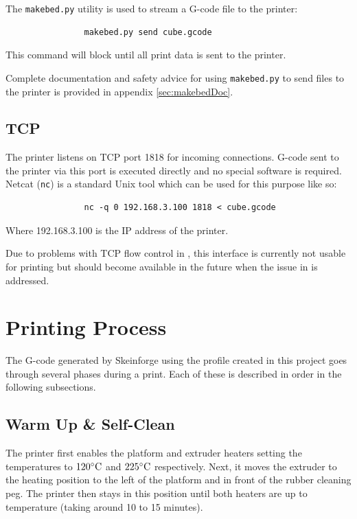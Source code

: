 			The \verb|makebed.py| utility is used to stream a G-code file to the
			printer:
			\begin{verbatim}
				makebed.py send cube.gcode
			\end{verbatim}
			This command will block until all print data is sent to the printer.
			
			Complete documentation and safety advice for using \verb|makebed.py| to
			send files to the printer is provided in appendix \ref{sec:makebedDoc}.
			
		\subsection{TCP}
			
			The printer listens on TCP port 1818 for incoming connections. G-code sent
			to the printer via this port is executed directly and no special software
			is required. Netcat (\verb|nc|) is a standard Unix tool which can be used
			for this purpose like so:
			\begin{verbatim}
				nc -q 0 192.168.3.100 1818 < cube.gcode
			\end{verbatim}
			Where 192.168.3.100 is the IP address of the printer.
			
			Due to problems with TCP flow control in \uIP{}, this interface is
			currently not usable for printing but should become available in the
			future when the issue in \uIP{} is addressed.
	
	\section{Printing Process}
		
		The G-code generated by Skeinforge using the profile created in this project
		goes through several phases during a print. Each of these is described in
		order in the following subsections.
		
		\subsection{Warm Up \& Self-Clean}
			
			The printer first enables the platform and extruder heaters setting the
			temperatures to $120^\circ\textrm{C}$ and $225^\circ\textrm{C}$ respectively. Next, it moves the
			extruder to the heating position to the left of the platform and in front
			of the rubber cleaning peg. The printer then stays in this position until
			both heaters are up to temperature (taking around 10 to 15 minutes).
			
